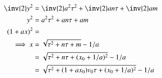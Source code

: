 \documentclass{article}      %
\begin{document}
\begin{align*}
\inv{2} y^2 &= \inv{2} a^2 \tau^2 + \inv{2} a n \tau + \inv{2} a m \\
y^2 &= a^2 \tau^2 + a n\tau + a m \\
(1+ax)^2 &= \\
\implies
x
&= \sqrt{\tau^2 + n\tau + m} -1/a \\
&= \sqrt{\tau^2 + n\tau + (x_0 + 1/a)^2} -1/a \\
&= \sqrt{\tau^2 + (1 + a x_0)v_0 \tau + (x_0 + 1/a)^2} -1/a \\
\end{align*}

\end{document}
